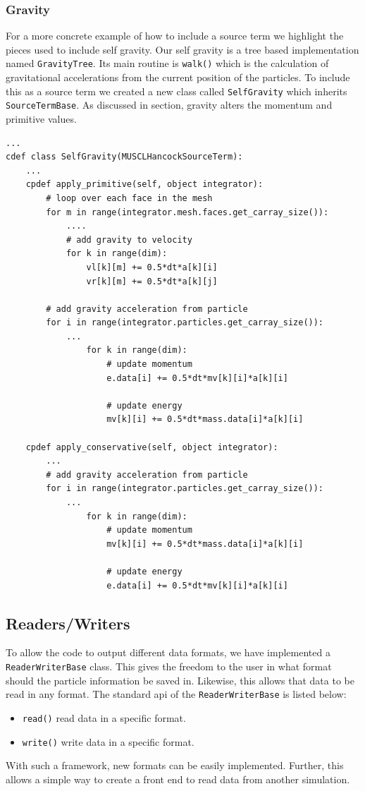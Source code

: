 \subsubsection{Gravity}
For a more concrete example of how to include a source term we highlight the
pieces used to include self gravity. Our self gravity is a tree based implementation
named \lstinline{GravityTree}. Its main routine is \lstinline{walk()} which is the
calculation of gravitational accelerations from the current position of the particles.
To include this as a source term we created a new class called \lstinline{SelfGravity}
which inherits \lstinline{SourceTermBase}. As discussed in section, gravity alters
the momentum and primitive values.
\begin{lstlisting}
...
cdef class SelfGravity(MUSCLHancockSourceTerm):
    ...
    cpdef apply_primitive(self, object integrator):
        # loop over each face in the mesh 
        for m in range(integrator.mesh.faces.get_carray_size()):
            ....
            # add gravity to velocity
            for k in range(dim):
                vl[k][m] += 0.5*dt*a[k][i]
                vr[k][m] += 0.5*dt*a[k][j]

        # add gravity acceleration from particle
        for i in range(integrator.particles.get_carray_size()):
            ...
                for k in range(dim):
                    # update momentum
                    e.data[i] += 0.5*dt*mv[k][i]*a[k][i]

                    # update energy 
                    mv[k][i] += 0.5*dt*mass.data[i]*a[k][i]

    cpdef apply_conservative(self, object integrator):
        ...
        # add gravity acceleration from particle
        for i in range(integrator.particles.get_carray_size()):
            ...
                for k in range(dim):
                    # update momentum
                    mv[k][i] += 0.5*dt*mass.data[i]*a[k][i]

                    # update energy 
                    e.data[i] += 0.5*dt*mv[k][i]*a[k][i]
\end{lstlisting}

\subsection{Readers/Writers}
To allow the code to output different data formats, we have implemented 
a \lstinline{ReaderWriterBase} class. This gives the freedom to the user
in what format should the particle information be saved in. Likewise, this
allows that data to be read in any format. The standard api of the 
\lstinline{ReaderWriterBase} is listed below:
\begin{itemize}
	\item \lstinline{read()} read data in a specific format.
    \item \lstinline{write()} write data in a specific format.
\end{itemize}
With such a framework, new formats can be easily implemented. Further, this
allows a simple way to create a front end to read data from another simulation.

